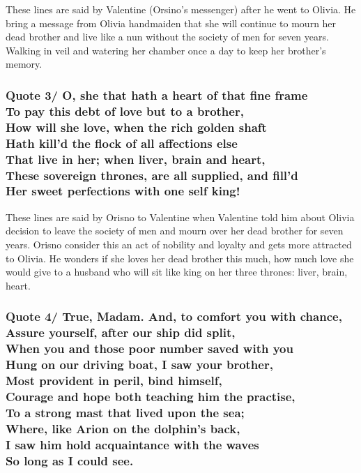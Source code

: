\documentclass[12pt, a4paper]{article}
\begin{document}
These lines are said by Valentine (Orsino's messenger) after he went
to Olivia. He bring a message from Olivia handmaiden that she will 
continue to mourn her dead brother and live like a nun without the 
society of men for seven years. Walking in veil and watering her 
chamber once a day to keep her brother's memory.

\subsubsection*{Quote 3/
  O, she that hath a heart of that fine frame\\
  To pay this debt of love but to a brother,\\
	How will she love, when the rich golden shaft\\
	Hath kill'd the flock of all affections else\\
	That live in her; when liver, brain and heart,\\
	These sovereign thrones, are all supplied, and fill'd\\
	Her sweet perfections with one self king!
}

These lines are said by Orisno to Valentine when Valentine told him
about Olivia decision to leave the society of men and mourn over her
dead brother for seven years. Orisno consider this an act of nobility and
loyalty and gets more attracted to Olivia. He wonders if she loves her
dead brother this much, how much love she would give to a husband who 
will sit like king on her three thrones: liver, brain, heart.

\subsubsection*{Quote 4/
  True, Madam. And, to comfort you with chance,\\
  Assure yourself, after our ship did split,\\
	When you and those poor number saved with you	\\
	Hung on our driving boat, I saw your brother,\\
	Most provident in peril, bind himself,\\
	Courage and hope both teaching him the practise,\\
	To a strong mast that lived upon the sea;\\
	Where, like Arion on the dolphin's back,\\
	I saw him hold acquaintance with the waves\\
	So long as I could see.
}
\end{document}
